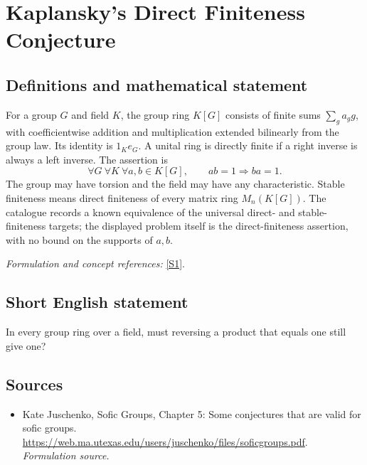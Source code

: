 \documentclass[11pt]{article}
\begin{document}
\section*{\texorpdfstring{Kaplansky's Direct Finiteness Conjecture}{Kaplansky's Direct Finiteness Conjecture}}\label{30006936}
\subsection{Definitions and mathematical statement}
For a group $G$ and field $K$, the group ring $K[G]$ consists of finite sums $\sum_g a_g g$, with coefficientwise addition and multiplication extended bilinearly from the group law. Its identity is $1_K e_G$. A unital ring is directly finite if a right inverse is always a left inverse. The assertion is
\[
 \forall G\ \forall K\ \forall a,b\in K[G],
 \qquad ab=1\Longrightarrow ba=1.
\]
The group may have torsion and the field may have any characteristic. Stable finiteness means direct finiteness of every matrix ring $M_n(K[G])$. The catalogue records a known equivalence of the universal direct- and stable-finiteness targets; the displayed problem itself is the direct-finiteness assertion, with no bound on the supports of $a,b$.
\par\smallskip\textit{Formulation and concept references:} \href{https://web.ma.utexas.edu/users/juschenko/files/soficgroups.pdf}{[S1]}.

\subsection{Short English statement}
In every group ring over a field, must reversing a product that equals one still give one?
\subsection{Sources}
\begin{itemize}
\item[S1]Kate Juschenko, Sofic Groups, Chapter 5: Some conjectures that are valid for sofic groups.
\url{https://web.ma.utexas.edu/users/juschenko/files/soficgroups.pdf}.
\textit{Formulation source.}
\end{itemize}
\end{document}
